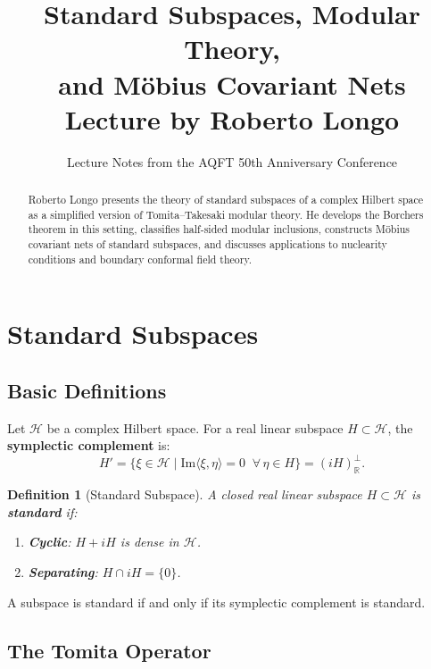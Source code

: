 \documentclass[11pt,a4paper]{article}
\title{\textbf{Standard Subspaces, Modular Theory,\\and M\"obius Covariant Nets}\\[6pt]
\large Lecture by Roberto Longo}
\author{Lecture Notes from the AQFT 50th Anniversary Conference}
\date{}
\newtheorem{definition}{Definition}[section]
\begin{document}
\maketitle

\begin{abstract}
Roberto Longo presents the theory of standard subspaces of a complex Hilbert space
as a simplified version of Tomita--Takesaki modular theory. He develops the Borchers
theorem in this setting, classifies half-sided modular inclusions, constructs
M\"obius covariant nets of standard subspaces, and discusses applications to
nuclearity conditions and boundary conformal field theory.
\end{abstract}

\tableofcontents

\section{Standard Subspaces}

\subsection{Basic Definitions}

Let $\mathcal{H}$ be a complex Hilbert space. For a real linear subspace
$H \subset \mathcal{H}$, the \textbf{symplectic complement} is:
\begin{equation}
  H' = \bigl\{ \xi \in \mathcal{H} \;\big|\; \mathrm{Im}\langle \xi, \eta\rangle = 0
  \;\;\forall\, \eta \in H \bigr\} = (iH)^\perp_{\mathbb{R}}.
\end{equation}

\begin{definition}[Standard Subspace]
A closed real linear subspace $H \subset \mathcal{H}$ is \textbf{standard} if:
\begin{enumerate}[nosep]
  \item \textbf{Cyclic}: $H + iH$ is dense in $\mathcal{H}$.
  \item \textbf{Separating}: $H \cap iH = \{0\}$.
\end{enumerate}
\end{definition}

A subspace is standard if and only if its symplectic complement is standard.

\subsection{The Tomita Operator}
\end{document}
